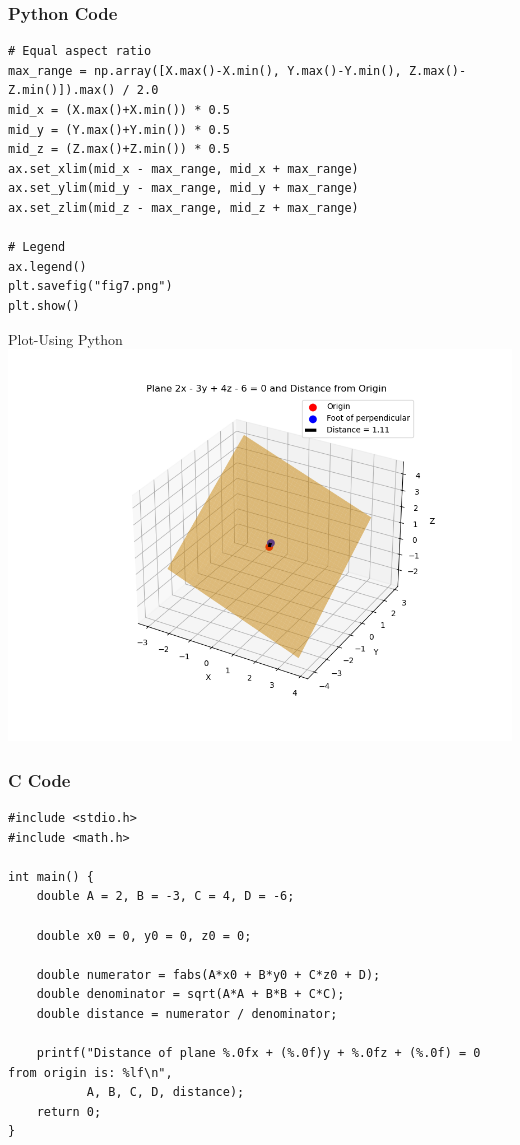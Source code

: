 \documentclass{beamer}
\begin{document}
\begin{frame}[fragile]
    \frametitle{Python Code}
    \begin{lstlisting}
# Equal aspect ratio
max_range = np.array([X.max()-X.min(), Y.max()-Y.min(), Z.max()-Z.min()]).max() / 2.0
mid_x = (X.max()+X.min()) * 0.5
mid_y = (Y.max()+Y.min()) * 0.5
mid_z = (Z.max()+Z.min()) * 0.5
ax.set_xlim(mid_x - max_range, mid_x + max_range)
ax.set_ylim(mid_y - max_range, mid_y + max_range)
ax.set_zlim(mid_z - max_range, mid_z + max_range)

# Legend
ax.legend()
plt.savefig("fig7.png") 
plt.show()
\end{lstlisting}
\end{frame}


\begin{frame}{Plot-Using Python}
    \centering
    \includegraphics[width=\columnwidth, height=0.8\textheight, keepaspectratio]{Figs/fig7.png}     
\end{frame}


\begin{frame}[fragile]
\frametitle{C Code}
\begin{lstlisting}
#include <stdio.h>
#include <math.h>

int main() {
    double A = 2, B = -3, C = 4, D = -6;

    double x0 = 0, y0 = 0, z0 = 0;

    double numerator = fabs(A*x0 + B*y0 + C*z0 + D);
    double denominator = sqrt(A*A + B*B + C*C);
    double distance = numerator / denominator;

    printf("Distance of plane %.0fx + (%.0f)y + %.0fz + (%.0f) = 0 from origin is: %lf\n",
           A, B, C, D, distance);
    return 0;
}
\end{lstlisting}

\end{frame}
\end{document}
